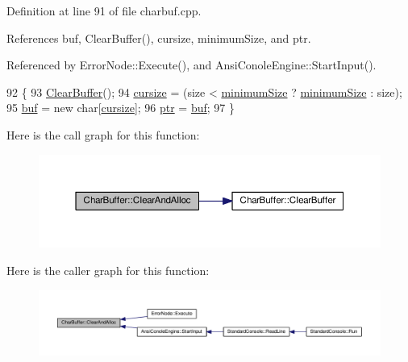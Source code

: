 Definition at line 91 of file charbuf.\+cpp.



References buf, Clear\+Buffer(), cursize, minimum\+Size, and ptr.



Referenced by Error\+Node\+::\+Execute(), and Ansi\+Conole\+Engine\+::\+Start\+Input().


\begin{DoxyCode}
92 \{
93     \hyperlink{classCharBuffer_a0bcdd5708db4b04c887224e83a05086f}{ClearBuffer}();
94     \hyperlink{classCharBuffer_ac3265c68505802fbe8b590d5a423b0d0}{cursize} = (size < \hyperlink{classCharBuffer_a42fcc0397a2d7cb6d412a124de076aff}{minimumSize} ? \hyperlink{classCharBuffer_a42fcc0397a2d7cb6d412a124de076aff}{minimumSize} : size);
95     \hyperlink{classCharBuffer_a8bcd8491b24db4197b311eb361609674}{buf} = \textcolor{keyword}{new} \textcolor{keywordtype}{char}[\hyperlink{classCharBuffer_ac3265c68505802fbe8b590d5a423b0d0}{cursize}];
96     \hyperlink{classCharBuffer_a2d313433650506fd6609e6947729dfb0}{ptr} = \hyperlink{classCharBuffer_a8bcd8491b24db4197b311eb361609674}{buf};
97 \}
\end{DoxyCode}


Here is the call graph for this function\+:\nopagebreak
\begin{figure}[H]
\begin{center}
\leavevmode
\includegraphics[width=350pt]{classCharBuffer_a8c0927c2c05c954161151045f68581c6_cgraph}
\end{center}
\end{figure}




Here is the caller graph for this function\+:\nopagebreak
\begin{figure}[H]
\begin{center}
\leavevmode
\includegraphics[width=350pt]{classCharBuffer_a8c0927c2c05c954161151045f68581c6_icgraph}
\end{center}
\end{figure}


